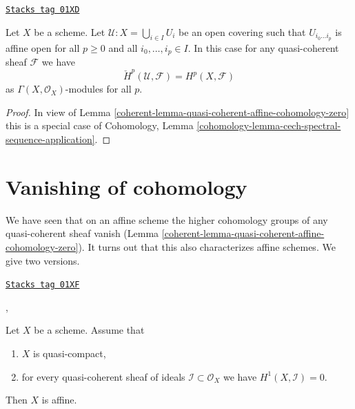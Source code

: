 \begin{lemma}
\label{coherent-lemma-cech-cohomology-quasi-coherent}
\href{https://stacks.math.columbia.edu/tag/01XD}{\texttt{Stacks tag 01XD}}

Let $X$ be a scheme.
Let $\mathcal{U} : X = \bigcup_{i \in I} U_i$ be an open covering such that
$U_{i_0 \ldots i_p}$ is affine open for all $p \ge 0$ and all
$i_0, \ldots, i_p \in I$.
In this case for any quasi-coherent sheaf $\mathcal{F}$ we have
$$
\check{H}^p(\mathcal{U}, \mathcal{F}) = H^p(X, \mathcal{F})
$$
as $\Gamma(X, \mathcal{O}_X)$-modules for all $p$.
\end{lemma}

\begin{proof}

In view of
Lemma \ref{coherent-lemma-quasi-coherent-affine-cohomology-zero}
this is a special case of
Cohomology, Lemma
\ref{cohomology-lemma-cech-spectral-sequence-application}.
\end{proof}

\section{Vanishing of cohomology}
\label{coherent-section-vanishing}
We have seen that on an affine scheme the higher cohomology groups
of any quasi-coherent sheaf vanish
(Lemma \ref{coherent-lemma-quasi-coherent-affine-cohomology-zero}).
It turns out that this also
characterizes affine schemes. We give two versions.

\begin{lemma}
\label{coherent-lemma-quasi-compact-h1-zero-covering}
\href{https://stacks.math.columbia.edu/tag/01XF}{\texttt{Stacks tag 01XF}}

\begin{reference}
\cite{Serre-criterion}, \cite[II, Theorem 5.2.1 (d') and IV (1.7.17)]{EGA}
\end{reference}

Let $X$ be a scheme.
Assume that
\begin{enumerate}
\item $X$ is quasi-compact,
\item for every quasi-coherent sheaf of ideals
$\mathcal{I} \subset \mathcal{O}_X$ we have $H^1(X, \mathcal{I}) = 0$.
\end{enumerate}
Then $X$ is affine.
\end{lemma}

